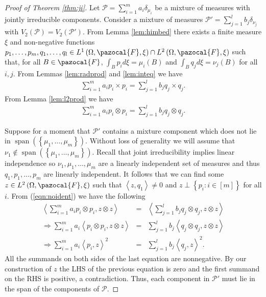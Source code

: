 \documentclass[aos,preprint]{imsart}
\def\l{\left}
\def\r{\right}
\def\sF{\pazocal{F}}
\def\sP{\mathscr{P}}
\def\spn{\operatorname{span}}
\theoremstyle{plain}
\theoremstyle{defintion}
\begin{document}
	\begin{proof}[Proof of Theorem \ref{thm:ji}]
		Let $\sP = \sum_{i=1}^m a_i \delta_{\mu_i}$ be a mixture of measures with jointly irreducible components. Consider a mixture of measures $\sP' = \sum_{j=1}^l b_j\delta_{\nu_j}$ with $V_2(\sP)= V_2(\sP')$. From Lemma \ref{lem:himbed} there exists a finite measure $\xi$ and non-negative functions $p_1,\ldots,p_m,q_1,\ldots,q_l \in L^1\left( \Omega, \sF, \xi \right)\cap L^2\left( \Omega, \sF, \xi \right)$ such that, for all $B\in \sF$, $\int_B p_i d\xi = \mu_i(B)$ and $\int_B q_j d\xi = \nu_j\left( B \right)$ for all $i,j$. From Lemmas \ref{lem:radprod} and \ref{lem:inteq} we have
		\begin{eqnarray*}
			\sum_{i=1}^m  a_i p_i \times p_i = \sum_{j=1}^l  b_j q_j\times q_j.
		\end{eqnarray*}
		From Lemma \ref{lem:l2prod} we have
		\begin{eqnarray}
			\label{eqn:noident}
			\sum_{i=1}^m  a_i p_i \otimes p_i = \sum_{j=1}^l  b_j q_j\otimes q_j.
		\end{eqnarray}

		Suppose for a moment that $\sP'$ contains a mixture component which does not lie in $\spn\left(\l\{ \mu_1,\ldots,\mu_m \r\}\right)$. Without loss of generality we will assume that $\nu_1 \notin \spn\left(\l\{ \mu_1,\ldots,\mu_m \r\}\right)$. Recall that joint irreducibility implies linear independence so $\nu_1,\mu_1,\ldots,\mu_m$ are a linearly independent set of measures and thus $q_1,p_1,\ldots,p_m$ are linearly independent. It follows that we can find some $z\in L^2\left( \Omega,\sF,\xi \right)$ such that $\l<z,q_1\r> \neq 0$ and $z\perp \left\{ p_i: i\in \left[ m \right] \right\}$ for all $i$. From (\ref{eqn:noident}) we have the following
		\begin{eqnarray*}
			\l<\sum_{i=1}^m  a_i p_i \otimes p_i,z\otimes z\r> &=& \l<\sum_{j=1}^l  b_j q_j\otimes q_j,z\otimes z\r>\\
			\Rightarrow \sum_{i=1}^m a_i\l<   p_i \otimes p_i,z\otimes z\r> &=& \sum_{j=1}^l b_j\l<   q_j\otimes q_j,z\otimes z\r>\\
			\Rightarrow \sum_{i=1}^m a_i\l<   p_i ,z\r>^2 &=& \sum_{j=1}^l b_j\l<   q_j,z\r>^2.
		\end{eqnarray*}
		All the summands on both sides of the last equation are nonnegative. By our construction of $z$ the LHS of the previous equation is zero and the first summand on the RHS is positive, a contradiction. Thus, each component in $\sP'$ must lie in the span of the components of $\sP$.


\end{proof}
\end{document}
